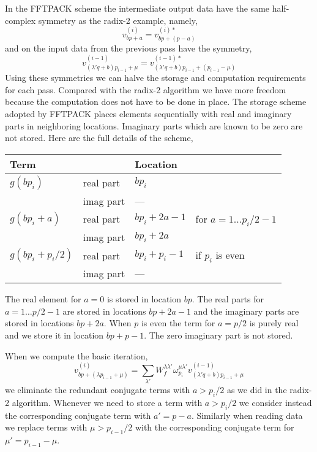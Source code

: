 \documentclass[fleqn,12pt]{article}
\begin{document}
%
In the FFTPACK scheme the intermediate output data have the same
half-complex symmetry as the radix-2 example, namely,
%
\begin{equation}
v^{(i)}_{b p + a} = v^{(i)*}_{b p + (p - a)}
\end{equation}
%
and on the input data from the previous pass have the symmetry,
%
\begin{equation}
v^{(i-1)}_{(\lambda' q + b) p_{i-1} + \mu} = v^{(i-1)*}_{(\lambda' q +
b) p_{i-1} + (p_{i-1} - \mu)}
\end{equation}
%
Using these symmetries we can halve the storage and computation
requirements for each pass. Compared with the radix-2 algorithm we
have more freedom because the computation does not have to be done in
place. The storage scheme adopted by FFTPACK places elements
sequentially with real and imaginary parts in neighboring
locations. Imaginary parts which are known to be zero are not
stored. Here are the full details of the scheme,
%
\begin{center}
\renewcommand{\arraystretch}{1.5}
\begin{tabular}{|l|lll|}
\hline Term & & Location & \\
\hline
$g(b p_i)$        
        & real part & $b p_{i} $ & \\
        & imag part & --- & \\
\hline
$g(b p_i + a)$ 
        & real part & $b p_{i} + 2a - 1 $& for $a = 1 \dots p_i/2 - 1$ \\
        & imag part & $b p_{i} + 2a$ & \\
\hline
$g(b p_{i} + p_{i}/2)$ 
        & real part & $b p_i + p_{i} - 1$ & if $p_i$ is even\\
        & imag part & --- & \\
\hline
\end{tabular}
\end{center}
%
The real element for $a=0$ is stored in location $bp$.  The real parts
for $a = 1 \dots p/2 - 1$ are stored in locations $bp + 2a -1$ and the
imaginary parts are stored in locations $b p + 2 a$.  When $p$ is even
the term for $a = p/2$ is purely real and we store it in location $bp
+ p - 1$. The zero imaginary part is not stored.

When we compute the basic iteration,
%
\begin{equation}
v^{(i)}_{b p + (\lambda p_{i-1} + \mu)} = \sum_{\lambda'} 
W^{\lambda \lambda'}_f
\omega^{\mu\lambda'}_{p_i} v^{(i-1)}_{(\lambda' q + b)p_{i-1} + \mu}
\end{equation}
%
we eliminate the redundant conjugate terms with $a > p_{i}/2$ as we
did in the radix-2 algorithm. Whenever we need to store a term with $a
> p_{i}/2$ we consider instead the corresponding conjugate term with
$a' = p - a$. Similarly when reading data we replace terms with $\mu >
p_{i-1}/2$ with the corresponding conjugate term for $\mu' = p_{i-1} -
\mu$.
\end{document}
